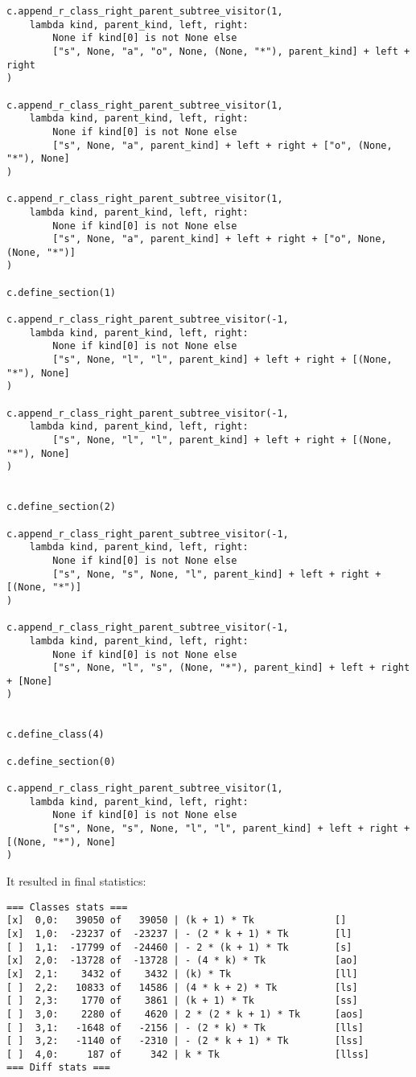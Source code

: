 \documentclass[final]{article}
\theoremstyle{definition}
\theoremstyle{definition}
\theoremstyle{remark}
\begin{document}
\begin{lstlisting}
c.append_r_class_right_parent_subtree_visitor(1,
    lambda kind, parent_kind, left, right:
        None if kind[0] is not None else
        ["s", None, "a", "o", None, (None, "*"), parent_kind] + left + right
)

c.append_r_class_right_parent_subtree_visitor(1,
    lambda kind, parent_kind, left, right:
        None if kind[0] is not None else
        ["s", None, "a", parent_kind] + left + right + ["o", (None, "*"), None]
)

c.append_r_class_right_parent_subtree_visitor(1,
    lambda kind, parent_kind, left, right:
        None if kind[0] is not None else
        ["s", None, "a", parent_kind] + left + right + ["o", None, (None, "*")]
)

c.define_section(1)

c.append_r_class_right_parent_subtree_visitor(-1,
    lambda kind, parent_kind, left, right:
        None if kind[0] is not None else
        ["s", None, "l", "l", parent_kind] + left + right + [(None, "*"), None]
)

c.append_r_class_right_parent_subtree_visitor(-1,
    lambda kind, parent_kind, left, right:
        ["s", None, "l", "l", parent_kind] + left + right + [(None, "*"), None]
)


c.define_section(2)

c.append_r_class_right_parent_subtree_visitor(-1,
    lambda kind, parent_kind, left, right:
        None if kind[0] is not None else
        ["s", None, "s", None, "l", parent_kind] + left + right + [(None, "*")]
)

c.append_r_class_right_parent_subtree_visitor(-1,
    lambda kind, parent_kind, left, right:
        None if kind[0] is not None else
        ["s", None, "l", "s", (None, "*"), parent_kind] + left + right + [None]
)


c.define_class(4)

c.define_section(0)

c.append_r_class_right_parent_subtree_visitor(1,
    lambda kind, parent_kind, left, right:
        None if kind[0] is not None else
        ["s", None, "s", None, "l", "l", parent_kind] + left + right + [(None, "*"), None]
)
\end{lstlisting}

It resulted in final statistics:

\begin{lstlisting}
=== Classes stats ===
[x]  0,0:   39050 of   39050 | (k + 1) * Tk              []
[x]  1,0:  -23237 of  -23237 | - (2 * k + 1) * Tk        [l]
[ ]  1,1:  -17799 of  -24460 | - 2 * (k + 1) * Tk        [s]
[x]  2,0:  -13728 of  -13728 | - (4 * k) * Tk            [ao]
[x]  2,1:    3432 of    3432 | (k) * Tk                  [ll]
[ ]  2,2:   10833 of   14586 | (4 * k + 2) * Tk          [ls]
[ ]  2,3:    1770 of    3861 | (k + 1) * Tk              [ss]
[ ]  3,0:    2280 of    4620 | 2 * (2 * k + 1) * Tk      [aos]
[ ]  3,1:   -1648 of   -2156 | - (2 * k) * Tk            [lls]
[ ]  3,2:   -1140 of   -2310 | - (2 * k + 1) * Tk        [lss]
[ ]  4,0:     187 of     342 | k * Tk                    [llss]
=== Diff stats ===
\end{lstlisting}
\end{document}
